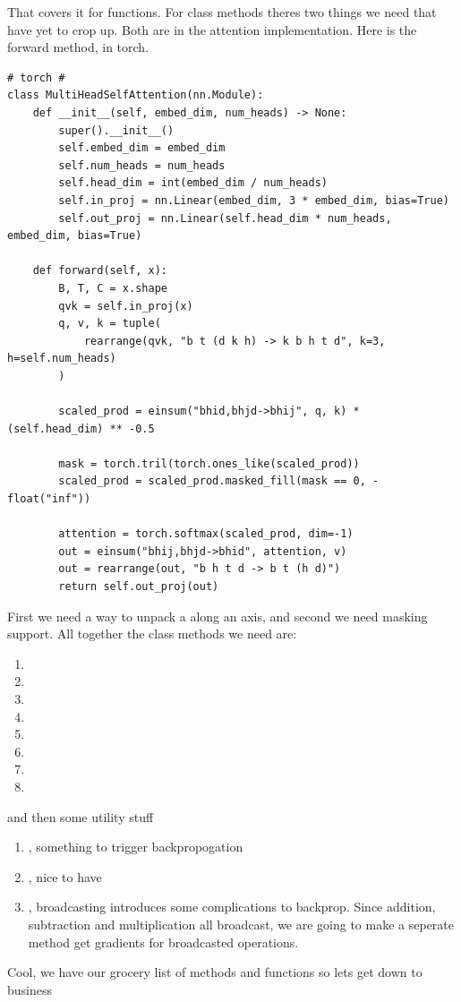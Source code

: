 \documentclass[11pt]{article}
\begin{document}
That covers it for functions. For class methods theres two things we need that have yet to crop up. Both are in 
the attention implementation. Here is the forward method, in torch.
\begin{verbatim}
# torch # 
class MultiHeadSelfAttention(nn.Module):
    def __init__(self, embed_dim, num_heads) -> None:
        super().__init__()
        self.embed_dim = embed_dim
        self.num_heads = num_heads
        self.head_dim = int(embed_dim / num_heads)
        self.in_proj = nn.Linear(embed_dim, 3 * embed_dim, bias=True)
        self.out_proj = nn.Linear(self.head_dim * num_heads, embed_dim, bias=True)

    def forward(self, x):
        B, T, C = x.shape
        qvk = self.in_proj(x)
        q, v, k = tuple(
            rearrange(qvk, "b t (d k h) -> k b h t d", k=3, h=self.num_heads)
        )

        scaled_prod = einsum("bhid,bhjd->bhij", q, k) * (self.head_dim) ** -0.5

        mask = torch.tril(torch.ones_like(scaled_prod))
        scaled_prod = scaled_prod.masked_fill(mask == 0, -float("inf"))

        attention = torch.softmax(scaled_prod, dim=-1)
        out = einsum("bhij,bhjd->bhid", attention, v)
        out = rearrange(out, "b h t d -> b t (h d)")
        return self.out_proj(out)
\end{verbatim}
First we need a way to unpack a  along an axis, and second we need masking support. All together
the class methods we need are:
\begin{enumerate}
  \item {}
  \item {}
  \item {}
  \item {}
  \item {}
  \item {}
  \item {}
  \item {}
\end{enumerate}
and then some utility stuff
\begin{enumerate}[resume]
  \item {}, something to trigger backpropogation 
  \item {}, nice to have
  \item {}, broadcasting introduces some complications to backprop. Since addition, subtraction
    and multiplication all broadcast, we are going to make a seperate method get gradients for broadcasted operations.
\end{enumerate}
Cool, we have our grocery list of methods and functions so lets get down to business
\end{document}
